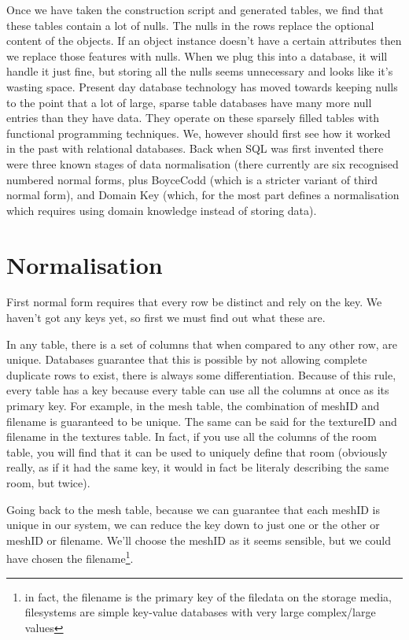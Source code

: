 Once we have taken the construction script and generated tables, we find that
these tables contain a lot of nulls. The nulls in the rows replace the optional
content of the objects. If an object instance doesn't have a certain attributes
then we replace those features with nulls. When we plug this into a database,
it will handle it just fine, but storing all the nulls seems unnecessary and
looks like it's wasting space. Present day database technology has moved
towards keeping nulls to the point that a lot of large, sparse table databases
have many more null entries than they have data. They operate on these sparsely
filled tables with functional programming techniques. We, however should first
see how it worked in the past with relational databases.  Back when SQL was
first invented there were three known stages of data normalisation (there
currently are six recognised numbered normal forms, plus BoyceCodd (which is
a stricter variant of third normal form), and Domain Key (which, for the
most part defines a normalisation which requires using domain knowledge instead
of storing data).

\section{Normalisation}

First normal form requires that every row be distinct and rely on the key.  We
haven't got any keys yet, so first we must find out what these are.

In any table, there is a set of columns that when compared to any other row,
are unique. Databases guarantee that this is possible by not allowing complete
duplicate rows to exist, there is always some differentiation.  Because of this
rule, every table has a key because every table can use all the columns at once
as its primary key. For example, in the mesh table, the combination of meshID
and filename is guaranteed to be unique. The same can be said for the textureID
and filename in the textures table. In fact, if you use all the columns of the
room table, you will find that it can be used to uniquely define that room
(obviously really, as if it had the same key, it would in fact be literaly
describing the same room, but twice).

Going back to the mesh table, because we can guarantee that each meshID is
unique in our system, we can reduce the key down to just one or the other or
meshID or filename. We'll choose the meshID as it seems sensible, but we could
have chosen the filename\footnote{in fact, the filename is the primary key of
the filedata on the storage media, filesystems are simple key-value databases
with very large complex/large values}.

